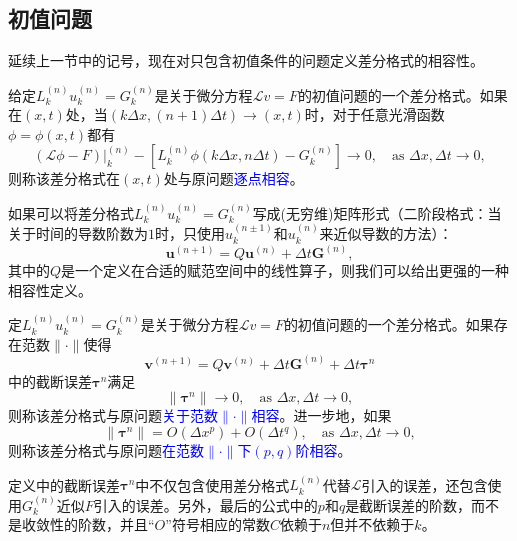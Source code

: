 \documentclass[a4paper,10pt]{ctexart}
\begin{document}
\subsection{初值问题}
延续上一节中的记号，现在对只包含初值条件的问题定义差分格式的相容性。
\begin{definition}
    给定$ L_k^{(n)}u^{(n)}_k = G^{(n)}_k $是关于微分方程$ \mathcal{L}v=F $的初值问题的一个差分格式。如果在$ (x,t) $处，当$ (k \Delta x,(n+1)\Delta t)\to (x,t) $时，对于任意光滑函数$ \phi =\phi(x,t) $都有
    \begin{equation}
        (\mathcal{L}\phi - F)|_k^{(n)} - [L_k^{(n)}\phi(k \Delta x, n \Delta t)-G_k^{(n)}]\longrightarrow 0, \quad \text{as } \Delta x,\Delta t\longrightarrow 0,
    \end{equation}
    则称该差分格式在$ (x,t) $处与原问题\textcolor{blue}{逐点相容}。
\end{definition}

如果可以将差分格式$ L_k^{(n)}u^{(n)}_k = G^{(n)}_k $写成(无穷维)矩阵形式（二阶段格式：当关于时间的导数阶数为$ 1 $时，只使用$ u^{(n\pm1)}_k $和$ u^{(n)}_k $来近似导数的方法）：
\begin{equation}
    \bm{u}^{(n+1)} = Q \bm{u}^{(n)} + \Delta t \bm{G}^{(n)},
\end{equation}
其中的$ Q $是一个定义在合适的赋范空间中的线性算子，则我们可以给出更强的一种相容性定义。

\begin{definition}
    定$ L_k^{(n)}u^{(n)}_k = G^{(n)}_k $是关于微分方程$ \mathcal{L}v=F $的初值问题的一个差分格式。如果存在范数$ \| \cdot \| $使得
    \begin{equation}
        \bm{v}^{(n+1)} = Q \bm{v}^{(n)} + \Delta t \bm{G}^{(n)} + \Delta t \bm{\tau}^n
    \end{equation}
    中的截断误差$ \bm{\tau}^n $满足
    \begin{equation}
        \| \bm{\tau}^n \| \longrightarrow 0, \quad \text{as } \Delta x,\Delta t\longrightarrow 0,
    \end{equation}
    则称该差分格式与原问题\textcolor{blue}{关于范数$ \| \cdot \| $相容}。进一步地，如果
    \begin{equation}
        \| \bm{\tau}^n \| = O(\Delta x^p) + O(\Delta t^q), \quad \text{as } \Delta x,\Delta t\longrightarrow 0,
    \end{equation}
    则称该差分格式与原问题\textcolor{blue}{在范数$ \| \cdot \| $下$ (p,q) $阶相容}。
\end{definition}
\noindent 定义中的截断误差$ \bm{\tau}^n $中不仅包含使用差分格式$ L^{(n)}_k $代替$ \mathcal{L} $引入的误差，还包含使用$ G^{(n)}_k $近似$ F $引入的误差。另外，最后的公式中的$ p $和$ q $是截断误差的阶数，而不是收敛性的阶数，并且“$ O $”符号相应的常数$ C $依赖于$ n $但并不依赖于$ k $。
\end{document}
